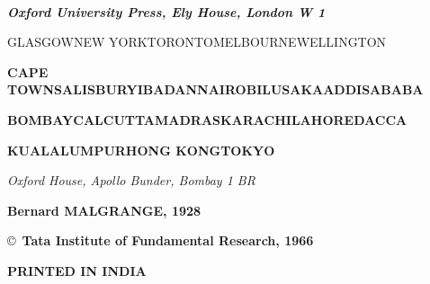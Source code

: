 \newpage

~\phantom{a}

\thispagestyle{empty}


\begin{center}
{\it\bfseries Oxford University Press, Ely House, London W 1}
\medskip

{\fontsize{7}{9}\selectfont\textsc{GLASGOW\quad NEW YORK\quad TORONTO\quad MELBOURNE\quad WELLINGTON}}

{\fontsize{7}{9}\selectfont\textbf{CAPE TOWN\quad SALISBURY\quad IBADAN\quad NAIROBI\quad LUSAKA\quad ADDIS\quad ABABA}}

{\fontsize{7}{9}\selectfont\textbf{BOMBAY\quad CALCUTTA\quad MADRAS\quad KARACHI\quad LAHORE\quad DACCA}}

{\fontsize{7}{9}\selectfont\textbf{KUALA\quad LUMPUR\quad HONG KONG\quad TOKYO}}

\smallskip

{\small\em Oxford House, Apollo Bunder, Bombay 1 BR}
\vskip 4cm

\vfill


{\bf Bernard MALGRANGE, 1928}

\copyright\ \textbf{Tata Institute of Fundamental Research, 1966}

\smallskip

{\fontsize{9}{9}\selectfont\bf PRINTED IN INDIA}
\end{center}
